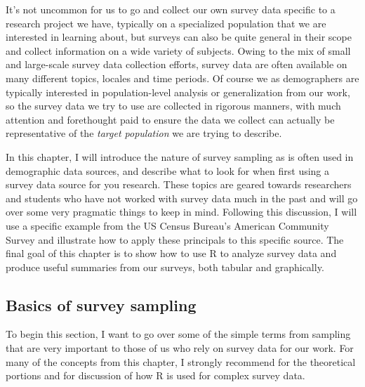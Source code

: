 \documentclass[
]{article}
\begin{document}
It's not uncommon for us to go and collect our own survey data specific to a research project we have, typically on a specialized population that we are interested in learning about, but surveys can also be quite general in their scope and collect information on a wide variety of subjects. Owing to the mix of small and large-scale survey data collection efforts, survey data are often available on many different topics, locales and time periods. Of course we as demographers are typically interested in population-level analysis or generalization from our work, so the survey data we try to use are collected in rigorous manners, with much attention and forethought paid to ensure the data we collect can actually be representative of the \emph{target population} we are trying to describe.

In this chapter, I will introduce the nature of survey sampling as is often used in demographic data sources, and describe what to look for when first using a survey data source for you research. These topics are geared towards researchers and students who have not worked with survey data much in the past and will go over some very pragmatic things to keep in mind. Following this discussion, I will use a specific example from the US Census Bureau's American Community Survey and illustrate how to apply these principals to this specific source. The final goal of this chapter is to show how to use R to analyze survey data and produce useful summaries from our surveys, both tabular and graphically.

\hypertarget{basics-of-survey-sampling}{%
\subsection{Basics of survey sampling}\label{basics-of-survey-sampling}}

To begin this section, I want to go over some of the simple terms from sampling that are very important to those of us who rely on survey data for our work. For many of the concepts from this chapter, I strongly recommend \citet{Lohr2019} for the theoretical portions and \citet{lumley2010} for discussion of how R is used for complex survey data.
\end{document}
